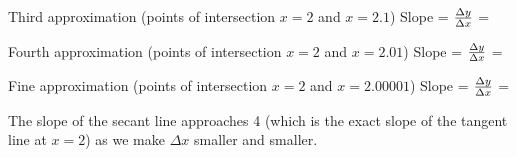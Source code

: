 \vskip 10pt

Third approximation (points of intersection $x = 2$ and $x = 2.1$) \hskip 50pt  Slope = ${\Delta y \over \Delta x}$ = 

\vskip 10pt

Fourth approximation (points of intersection $x = 2$ and $x = 2.01$) \hskip 50pt  Slope = ${\Delta y \over \Delta x}$ = 

\vskip 10pt

Fine approximation (points of intersection $x = 2$ and $x = 2.00001$) \hskip 50pt  Slope = ${\Delta y \over \Delta x}$ = 

\vskip 10pt

The slope of the secant line approaches 4 (which is the exact slope of the tangent line at $x=2$) as we make $\Delta x$ smaller and smaller.











